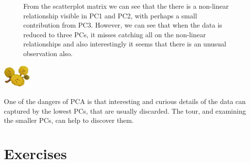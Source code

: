 \documentclass[
  letterpaper,
]{krantz}
\newcommand{\infobox}[1]{%
\noindent\colorbox{info!30}{%
\begin{minipage}{0.98\linewidth}%
    \centering%
    \begin{minipage}[c]{0.15\linewidth} %
      \includegraphics[width=1.5cm]{images/mulga-flowers2.png} %
    \end{minipage}%
    \hfill %
    \begin{minipage}[c]{0.8\linewidth} %
      \bigskip%
      \textsf{#1}%
      \bigskip%
    \end{minipage}%
    \hspace*{3mm}%
  \end{minipage}%
}%
}
\begin{document}
\begin{figure}


\caption{\label{fig-plane-nonlin-pairs}From the scatterplot matrix we
can see that the there is a non-linear relationship visible in PC1 and
PC2, with perhaps a small contribution from PC3. However, we can see
that when the data is reduced to three PCs, it misses catching all on
the non-linear relationships and also interestingly it seems that there
is an unusual observation also.}

\end{figure}%

\infobox{One of the dangers of PCA is that interesting and curious details of the data can captured by the lowest PCs, that are usually discarded. The tour, and examining the smaller PCs, can help to discover them.}

\section*{Exercises}\label{exercises-3}

\end{document}
